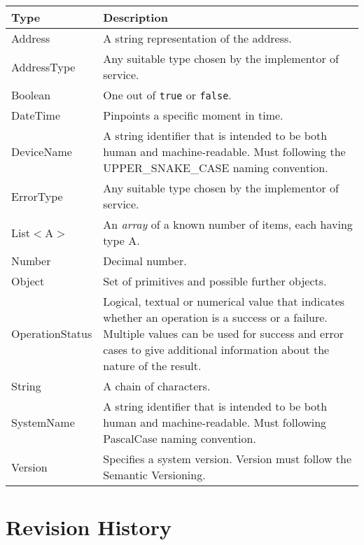 \documentclass[a4paper]{arrowhead}
\newcommand{\pdef}[1]{{\textcolor{ArrowheadGrey}{#1\label{sec:model:primitives:#1}\label{sec:model:primitives:#1s}\label{sec:model:primitives:#1es}}}}
\begin{document}
\begin{table}[ht!]
\begin{tabularx}{\textwidth}{| p{3cm} | X |} \hline
\rowcolor{gray!33} Type & Description \\ \hline
\pdef{Address}          & A string representation of the address. \\ \hline
\pdef{AddressType}      & Any suitable type chosen by the implementor of service. \\ \hline
\pdef{Boolean}          & One out of \texttt{true} or \texttt{false}. \\ \hline
\pdef{DateTime}         & Pinpoints a specific moment in time. \\ \hline
\pdef{DeviceName}             & A string identifier that is intended to be both human and machine-readable. Must following the UPPER\_SNAKE\_CASE naming convention. \\ \hline
\pdef{ErrorType}        & Any suitable type chosen by the implementor of service. \\ \hline
\pdef{List}$<$A$>$      & An \textit{array} of a known number of items, each having type A. \\ \hline
\pdef{Number}           & Decimal number. \\ \hline
\pdef{Object}           & Set of primitives and possible further objects. \\ \hline
\pdef{OperationStatus}  & Logical, textual or numerical value that indicates whether an operation is a success or a failure. Multiple values can be used for success and error cases to give additional information about the nature of the result. \\ \hline
\pdef{String}           & A chain of characters. \\ \hline
\pdef{SystemName}       & A string identifier that is intended to be both human and machine-readable. Must following PascalCase naming convention. \\ \hline
\pdef{Version}          & Specifies a system version. Version must follow the Semantic Versioning. \\ \hline
\end{tabularx}
\end{table}

\newpage




\newpage

\section{Revision History}
\end{document}
